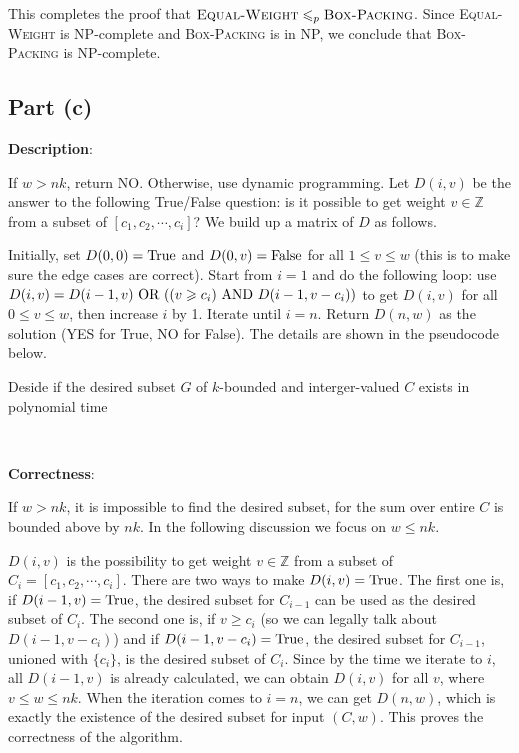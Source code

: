 \documentclass{article}
\begin{document}
This completes the proof that $\textsc{Equal-Weight}\leqslant_p\textsc{Box-Packing}$. Since \textsc{Equal-Weight} is NP-complete and \textsc{Box-Packing} is in NP, we conclude that \textsc{Box-Packing} is NP-complete.

\subsection{Part (c)}
\noindent\textbf{Description}:

If $w>nk$, return NO. Otherwise, use dynamic programming. Let $D(i,v)$ be the answer to the following True/False question: is it possible to get weight $v\in\mathbb{Z}$ from a subset of $[c_1,c_2,\cdots,c_i]$? We build up a matrix of $D$ as follows.

Initially, set $D(0,0)=\textup{True}$ and $D(0,v)=\textup{False}$ for all $1\leqslant v\leqslant w$ (this is to make sure the edge cases are correct). Start from $i=1$ and do the following loop: use $D(i,v)=D(i-1,v)\textup{ OR }((v\geqslant c_i)\textup{ AND }D(i-1,v-c_i))$ to get $D(i,v)$ for all $0\leqslant v\leqslant w$, then increase $i$ by 1. Iterate until $i=n$. Return $D(n,w)$ as the solution (YES for True, NO for False). The details are shown in the pseudocode below.
\begin{algorithm}
\caption{Deside if the desired subset $G$ of $k$-bounded and interger-valued $C$ exists in polynomial time}
\begin{algorithmic}[1]

\EndProcedure
\end{algorithmic}
\end{algorithm}

~

\noindent\textbf{Correctness}:

If $w>nk$, it is impossible to find the desired subset, for the sum over entire $C$ is bounded above by $nk$. In the following discussion we focus on $w\leqslant nk$.

$D(i,v)$ is the possibility to get weight $v\in\mathbb{Z}$ from a subset of $C_i=[c_1,c_2,\cdots,c_i]$. There are two ways to make $D(i,v)=\textup{True}$. The first one is, if $D(i-1,v)=\textup{True}$, the desired subset for $C_{i-1}$ can be used as the desired subset of $C_i$. The second one is, if $v\geqslant c_i$ (so we can legally talk about $D(i-1,v-c_i)$) and if $D(i-1,v-c_i)=\textup{True}$, the desired subset for $C_{i-1}$, unioned with $\{c_i\}$, is the desired subset of $C_i$. Since by the time we iterate to $i$, all $D(i-1,v)$ is already calculated, we can obtain $D(i,v)$ for all $v$, where $v\leqslant w\leqslant nk$. When the iteration comes to $i=n$, we can get $D(n,w)$, which is exactly the existence of the desired subset for input $(C,w)$. This proves the correctness of the algorithm.
\end{document}
